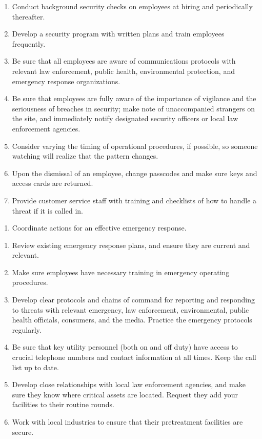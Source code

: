 \documentclass{article}
\begin{document}
\begin{enumerate}
\def\labelenumi{\alph{enumi}.}
\tightlist
\item
  Conduct background security checks on employees at hiring and
  periodically thereafter.
\item
  Develop a security program with written plans and train employees
  frequently.
\item
  Be sure that all employees are aware of communications protocols with
  relevant law enforcement, public health, environmental protection, and
  emergency response organizations.
\item
  Be sure that employees are fully aware of the importance of vigilance
  and the seriousness of breaches in security; make note of
  unaccompanied strangers on the site, and immediately notify designated
  security officers or local law enforcement agencies.
\item
  Consider varying the timing of operational procedures, if possible, so
  someone watching will realize that the pattern changes.
\item
  Upon the dismissal of an employee, change passcodes and make sure keys
  and access cards are returned.
\item
  Provide customer service staff with training and checklists of how to
  handle a threat if it is called in.
\end{enumerate}

\begin{enumerate}
\def\labelenumi{\arabic{enumi}.}
\setcounter{enumi}{2}
\tightlist
\item
  Coordinate actions for an effective emergency response.
\end{enumerate}

\begin{enumerate}
\def\labelenumi{\alph{enumi}.}
\tightlist
\item
  Review existing emergency response plans, and ensure they are current
  and relevant.
\item
  Make sure employees have necessary training in emergency operating
  procedures.
\item
  Develop clear protocols and chains of command for reporting and
  responding to threats with relevant emergency, law enforcement,
  environmental, public health officials, consumers, and the media.
  Practice the emergency protocols regularly.
\item
  Be sure that key utility personnel (both on and off duty) have access
  to crucial telephone numbers and contact information at all times.
  Keep the call list up to date.
\item
  Develop close relationships with local law enforcement agencies, and
  make sure they know where critical assets are located. Request they
  add your facilities to their routine rounds.
\item
  Work with local industries to ensure that their pretreatment
  facilities are secure.
\end{enumerate}
\end{document}
